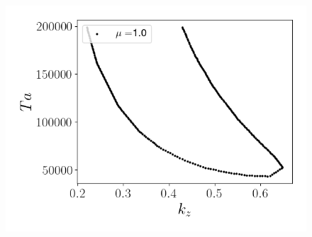 \documentclass[varwidth]{standalone}
\begin{document}
\begin{figure}
\includegraphics[scale = 0.18]{island_eta_0.9_mu_1.0_m_-20.png} 
\end{figure}
\end{document}
